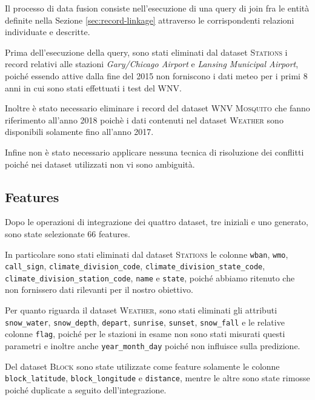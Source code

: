 Il processo di data fusion consiste nell'esecuzione di una query di join 
fra le entità definite nella Sezione \ref{sec:record-linkage} attraverso le 
corrispondenti relazioni individuate e descritte.

Prima dell'esecuzione della query, sono stati eliminati dal dataset 
\textsc{Stations} i record relativi alle stazioni \textit{Gary/Chicago Airport} 
e \textit{Lansing Municipal Airport}, poiché essendo attive dalla fine del 2015 
non forniscono i dati meteo per i primi 8 anni in cui sono stati effettuati i 
test del WNV.

Inoltre è stato necessario eliminare i record del dataset \textsc{WNV Mosquito} 
che fanno riferimento all'anno 2018 poichè i dati contenuti nel dataset 
\textsc{Weather} sono disponibili solamente fino all'anno 2017.

Infine non è stato necessario applicare nessuna tecnica di risoluzione dei conflitti 
poiché nei dataset utilizzati non vi sono ambiguità.

\subsection{Features}
Dopo le operazioni di integrazione dei quattro dataset, tre iniziali e uno 
generato, sono state selezionate 66 features.

In particolare sono stati eliminati dal dataset \textsc{Stations} le colonne 
\texttt{wban}, \texttt{wmo}, \texttt{call\_sign}, 
\texttt{climate\_division\_code}, \texttt{climate\_division\_state\_code}, \\
\texttt{climate\_division\_station\_code}, \texttt{name} e \texttt{state}, 
poiché abbiamo ritenuto che non fornissero dati rilevanti per il nostro 
obiettivo.

Per quanto riguarda il dataset \textsc{Weather}, sono stati eliminati gli 
attributi \texttt{snow\_water}, 
\texttt{snow\_depth}, \texttt{depart}, \texttt{sunrise}, \texttt{sunset}, 
\texttt{snow\_fall} e le relative colonne \texttt{flag}, poiché per le stazioni 
in esame non sono stati misurati questi parametri e inoltre anche 
\texttt{year\_month\_day} poiché non influisce sulla predizione.

Del dataset \textsc{Block} sono state utilizzate come feature solamente le 
colonne \texttt{block\_latitude}, \texttt{block\_longitude} e 
\texttt{distance}, mentre le altre sono state rimosse poiché duplicate a 
seguito dell'integrazione.

